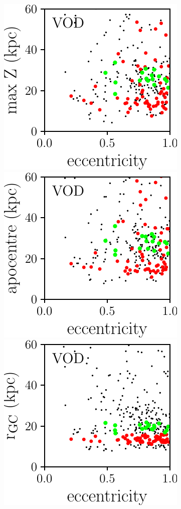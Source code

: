 \documentclass[a4paper,useAMS,usenatbib]{mnras}
\begin{document}
\begin{figure}
	\includegraphics[scale=0.473]{VOD_orbits_ecc_z.pdf}
    \includegraphics[scale=0.473]{VOD_orbits_apo_ecc.pdf} 
  \includegraphics[scale=0.473]{VOD_orbits_ecc_r.pdf} 

\end{figure}
\end{document}

